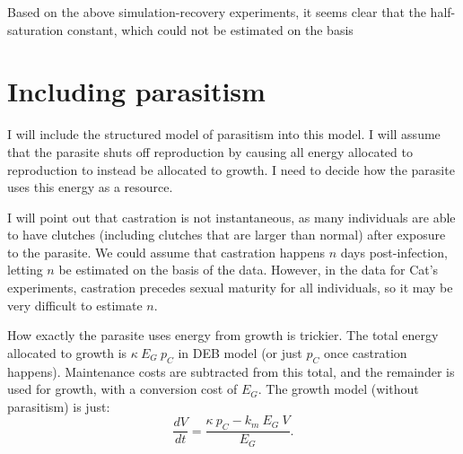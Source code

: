 \documentclass[12pt,reqno,final,pdftex]{amsart}\usepackage[]{graphicx}\usepackage[]{color}
\theoremstyle{plain}
\numberwithin{equation}{part}
\begin{document}
Based on the above simulation-recovery experiments, it seems clear that the half-saturation constant, which could not be estimated on the basis

\clearpage
\section*{Including parasitism}
I will include the structured model of parasitism into this model.
I will assume that the parasite shuts off reproduction by causing all energy allocated to reproduction to instead be allocated to growth.
I need to decide how the parasite uses this energy as a resource.

I will point out that castration is not instantaneous, as many individuals are able to have clutches (including clutches that are larger than normal) after exposure to the parasite.
We could assume that castration happens $n$ days post-infection, letting $n$ be estimated on the basis of the data.
However, in the data for Cat's experiments, castration precedes sexual maturity for all individuals, so it may be very difficult to estimate $n$.

How exactly the parasite uses energy from growth is trickier.
The total energy allocated to growth is $\kappa~E_G~p_C$ in DEB model (or just $p_C$ once castration happens).
Maintenance costs are subtracted from this total, and the remainder is used for growth, with a conversion cost of $E_G$.
The growth model (without parasitism) is just:
\begin{equation}
\frac{dV}{dt} = \frac{\kappa~p_C - k_m~E_G~V}{E_G}.
\end{equation}
\end{document}
